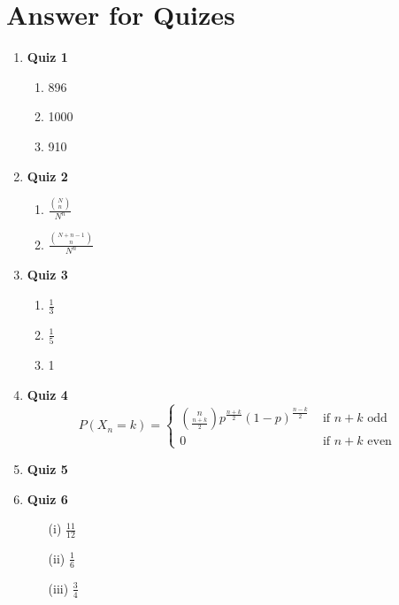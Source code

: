 \documentclass{article}
\begin{document}
\newpage

\newpage
\appendix


\section{Answer for Quizes}
\begin{enumerate}



\item \textbf{\large Quiz 1}
    \begin{enumerate}
        \item 896
        \item 1000
        \item 910
    \end{enumerate}

\item \textbf{\large Quiz 2}
    \begin{enumerate}
        \item $\frac{\binom{N}{n}}{N^n}$
        \item $\frac{\binom{N+n-1}{n}}{N^n}$
    \end{enumerate}

\item \textbf{\large Quiz 3}
    \begin{enumerate}
        \item $\frac{1}{3}$
        \item $\frac{1}{5}$
        \item 1
    \end{enumerate}

\item \textbf{\large Quiz 4}
    \[
    P(X_n = k) =
    \begin{cases}
        \binom{n}{\frac{n+k}{2}}p^{\frac{n+k}{2}}(1-p)^{\frac{n-k}{2}} & \text{ if } n+k \text{ odd } \\
        0 & \text{ if } n+k \text{ even }
    \end{cases}
    \]


\item \textbf{\large Quiz 5}


\item \textbf{\large Quiz 6}
\begin{enumerate}
    \item[(i)] $\frac{11}{12}$
    \item[(ii)] $\frac{1}{6}$
    \item[(iii)] $\frac{3}{4}$
\end{enumerate}


\end{enumerate}
\end{document}
